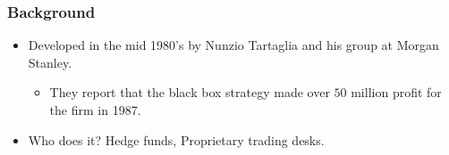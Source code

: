\documentclass[pdf,10pt,xcolor=dvipsnames,hide notes]{beamer}
\begin{document}
	\begin{frame}[label=frame1]
	\frametitle{Background}
	
	
	\begin{itemize}
		\justifying
					
		\item Developed in the mid 1980's by Nunzio Tartaglia and his group at Morgan Stanley.
		\begin{itemize}
			\item They report that the black box strategy made over $50$ million profit for the firm in 1987.
		\end{itemize}
	
	\vspace{0.3cm}
	
		\item Who does it? Hedge funds, Proprietary trading desks.
	
		
	\end{itemize}	
\end{frame}
\end{document}
